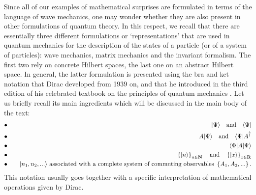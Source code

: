 \documentclass[a4wide,12pt]{report}
\begin{document}
Since all of our examples of mathematical surprises 
are formulated in terms of  
the language of wave mechanics, one may wonder whether 
they are also present in other formulations of quantum theory.
In this respect, we recall that 
there are essentially three
different formulations or `representations' that are used 
in quantum mechanics for the description of the states of
a particle (or of a system of particles): wave mechanics,
matrix mechanics and the invariant formalism.
The first two rely on concrete Hilbert spaces, the
last one on an abstract Hilbert space. In general,
the latter formulation is presented using the
bra and ket notation that  Dirac developed from  
1939 on, and that he introduced 
in the third edition of his celebrated 
textbook on the principles of quantum mechanics
\cite{d}.
 Let us briefly
recall its main
ingredients which will be discussed in the main body of the 
text:
\begin{eqnarray*}
& \bullet & \quad
| \Psi \rangle \quad {\rm and} \quad \langle \Psi |
\\
& \bullet & \quad
A | \Psi \rangle \quad {\rm and} \quad \langle \Psi |A^{\displaystyle{\dagger}}
\\
& \bullet & \quad
\langle \Phi |A|\Psi  \rangle
\\
& \bullet & \quad
\left\{ |n \rangle \right\}_{n \in {\bf N} }
\quad {\rm and} \quad
\left\{ |x \rangle \right\}_{x \in {\bf R} }
\\
& \bullet & \quad
|n_1, n_2,... \rangle
\ \mbox{associated with a complete 
system of commuting observables} 
\ \left\{ A_1, A_2 ,... \right\}
.
\end{eqnarray*}
This notation usually goes together
with a specific interpretation of mathematical
operations given by Dirac.
\end{document}
